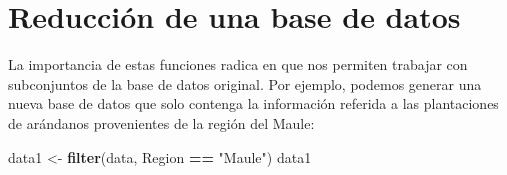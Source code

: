 \documentclass[]{book}
\newenvironment{Shaded}{\begin{snugshade}}{\end{snugshade}}
\newcommand{\KeywordTok}[1]{\textcolor[rgb]{0.13,0.29,0.53}{\textbf{#1}}}
\newcommand{\NormalTok}[1]{#1}
\newcommand{\OperatorTok}[1]{\textcolor[rgb]{0.81,0.36,0.00}{\textbf{#1}}}
\newcommand{\StringTok}[1]{\textcolor[rgb]{0.31,0.60,0.02}{#1}}
\begin{document}
\hypertarget{reduccion-de-una-base-de-datos}{%
\section{Reducción de una base de datos}\label{reduccion-de-una-base-de-datos}}

La importancia de estas funciones radica en que nos permiten trabajar con subconjuntos de la base de datos
original. Por ejemplo, podemos generar una nueva base de datos que solo contenga la información referida a
las plantaciones de arándanos provenientes de la región del Maule:

\begin{Shaded}
\begin{Highlighting}[]
\NormalTok{data1 <-}\StringTok{ }\KeywordTok{filter}\NormalTok{(data, Region }\OperatorTok{==}\StringTok{ "Maule"}\NormalTok{)}
\NormalTok{data1}
\end{Highlighting}
\end{Shaded}
\end{document}

